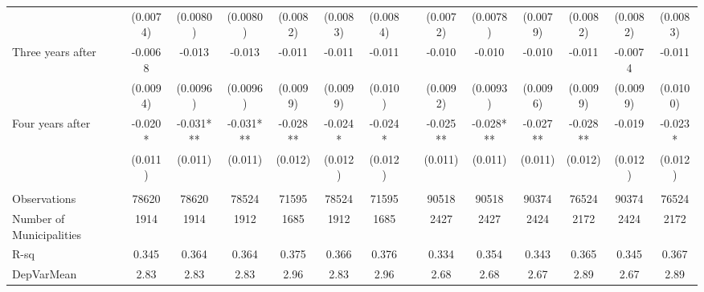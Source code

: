 \begin{tabular}{lccccccccccccc}
      & (0.0074) & (0.0080) & (0.0080) & (0.0082) & (0.0083) & (0.0084) &       & (0.0072) & (0.0078) & (0.0079) & (0.0082) & (0.0082) & (0.0083) \\
Three years after & -0.0068 & -0.013 & -0.013 & -0.011 & -0.011 & -0.011 &       & -0.010 & -0.010 & -0.010 & -0.011 & -0.0074 & -0.011 \\
      & (0.0094) & (0.0096) & (0.0096) & (0.0099) & (0.0099) & (0.010) &       & (0.0092) & (0.0093) & (0.0096) & (0.0099) & (0.0099) & (0.0100) \\
Four years after & -0.020* & -0.031*** & -0.031*** & -0.028** & -0.024* & -0.024* &       & -0.025** & -0.028*** & -0.027** & -0.028** & -0.019 & -0.023* \\
      & (0.011) & (0.011) & (0.011) & (0.012) & (0.012) & (0.012) &       & (0.011) & (0.011) & (0.011) & (0.012) & (0.012) & (0.012) \\
      &       &       &       &       &       &       &       &       &       &       &       &       &  \\
\midrule
Observations & 78620 & 78620 & 78524 & 71595 & 78524 & 71595 &       & 90518 & 90518 & 90374 & 76524 & 90374 & 76524 \\
Number of Municipalities & 1914  & 1914  & 1912  & 1685  & 1912  & 1685  &       & 2427  & 2427  & 2424  & 2172  & 2424  & 2172 \\
R-sq  & 0.345 & 0.364 & 0.364 & 0.375 & 0.366 & 0.376 &       & 0.334 & 0.354 & 0.343 & 0.365 & 0.345 & 0.367 \\
DepVarMean & 2.83  & 2.83  & 2.83  & 2.96  & 2.83  & 2.96  &       & 2.68  & 2.68  & 2.67  & 2.89  & 2.67  & 2.89 \\
\bottomrule
\bottomrule
\end{tabular}%
